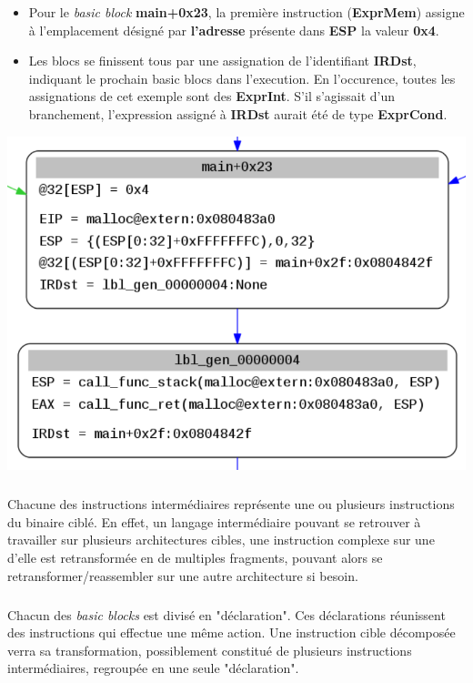 \begin{itemize}
    \item Pour le \textit{basic block} \textbf{main+0x23}, la première instruction (\textbf{ExprMem}) assigne à l'emplacement désigné par \textbf{l'adresse}
        présente dans \textbf{ESP} la valeur \textbf{0x4}.
    \item Les blocs se finissent tous par une assignation de l'identifiant \textbf{IRDst}, indiquant le prochain basic blocs dans l'execution.
        En l'occurence, toutes les assignations de cet exemple sont des \textbf{ExprInt}. S'il s'agissait d'un branchement, l'expression assigné à \textbf{IRDst}
        aurait été de type \textbf{ExprCond}.
\end{itemize}
\begin{center}
\includegraphics[scale=0.3]{ir.png}\newline
\end{center}
\subparagraph{}
Chacune des instructions intermédiaires représente une ou plusieurs instructions du binaire ciblé. En effet, un langage intermédiaire
pouvant se retrouver à travailler sur plusieurs architectures cibles, une instruction complexe sur une d'elle est retransformée en de multiples
fragments, pouvant alors se retransformer/reassembler sur une autre architecture si besoin.
\subparagraph{}
Chacun des \textit{basic blocks} est divisé en "déclaration". Ces déclarations réunissent des instructions qui effectue une même action. Une instruction cible décomposée
verra sa transformation, possiblement constitué de plusieurs instructions intermédiaires, regroupée en une seule "déclaration".



